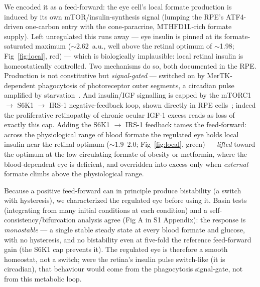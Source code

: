 \documentclass[10pt,letterpaper]{article}
\begin{document}
We encoded it as a feed-forward: the eye cell's local formate production is
induced by its own mTOR/insulin-synthesis signal (lumping the RPE's ATF4-driven
one-carbon entry with the cone-paracrine, MTHFD1L-rich formate supply). Left
unregulated this runs away --- eye insulin is pinned at its formate-saturated
maximum (${\sim}2.62$~a.u., well above the retinal optimum of $\sim$1.98;
Fig~\ref{fig:local}, red) --- which is biologically implausible: local retinal
insulin is homeostatically controlled. Two mechanisms do so, both documented in
the RPE. Production is not constitutive but \emph{signal-gated} --- switched on by
MerTK-dependent phagocytosis of photoreceptor outer segments, a circadian pulse
amplified by starvation~\cite{etchegaray2023}. And insulin/IGF
signalling is capped by the mTORC1 $\rightarrow$ S6K1 $\rightarrow$ IRS-1
negative-feedback loop, shown directly in RPE cells~\cite{leontieva2014}; indeed the proliferative retinopathy of chronic ocular IGF-1 excess
\cite{ruberte2004,villacampa2013} reads as loss of exactly this cap. Adding the
S6K1 $\rightarrow$ IRS-1 feedback tames the feed-forward: across the physiological
range of blood formate the regulated eye holds local insulin near the retinal
optimum (${\sim}1.9$--$2.0$; Fig~\ref{fig:local}, green) --- \emph{lifted} toward
the optimum at the low circulating formate of obesity or metformin, where the
blood-dependent eye is deficient, and overridden into excess only when
\emph{external} formate climbs above the physiological range.

Because a positive feed-forward can in principle produce bistability (a switch
with hysteresis), we characterized the regulated eye before using it. Basin tests
(integrating from many initial conditions at each condition) and a
self-consistency/bifurcation analysis agree (Fig A in S1 Appendix): the
response is \emph{monostable} --- a single stable steady state at every blood
formate and glucose, with no hysteresis, and no bistability even at five-fold the
reference feed-forward gain (the S6K1 cap prevents it). The regulated eye is
therefore a smooth homeostat, not a switch; were the retina's insulin pulse
switch-like (it is circadian), that behaviour would come from the phagocytosis
signal-gate, not from this metabolic loop.
\end{document}
